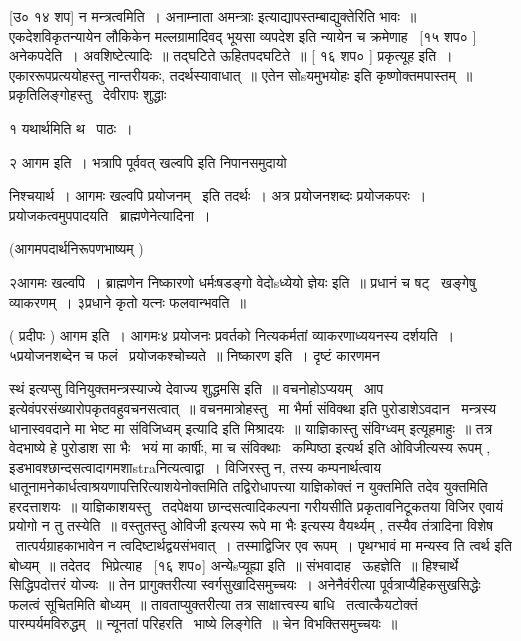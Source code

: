 \documentclass[11pt, openany]{book}
\begin{document}
 [उ० १४ शप] न मन्त्रत्वमिति~। {\qt अनाम्नाता अमन्त्राः}
इत्याद्यापस्तम्बाद्युक्तेरिति भावः~॥ एकदेशविकृतन्यायेन लौकिकेन
मल्लग्रामादिवद् भूयसा व्यपदेश इति न्यायेन च क्रमेणाह \textendash\ [१५ शप० ]
अनेकपदेति~। अवशिष्टेत्यादिः~॥ तद्घटिते ऊहितपदघटिते~॥ [ १६
शप० ] प्रकृत्यूह इति~। एकाररूपप्रत्ययोहस्तु नान्तरीयकः,
तदर्थस्यावाधात्~॥ एतेन {\qt सोsयमुभयोहः} इति कृष्णोक्तमपास्तम्~॥
प्रकृतिलिङ्गोहस्तु \textendash\ देवीरापः शुद्धाः 



१ {\qt यथार्थमिति} थ \textendash\ पाठः~। 

२ आगम इति~। भत्रापि पूर्ववत् {\qt खल्वपि} इति निपानसमुदायो 

निश्चयार्थ~। आगमः खल्वपि प्रयोजनम् \textendash\ इति तदर्थः~। अत्र प्रयोजनशब्दः
प्रयोजकपरः~। प्रयोजकत्वमुपपादयति \textendash\ ब्राह्मणेनेत्यादिना~। 





 (आगमपदार्थनिरूपणभाष्यम् ) 

 २आगमः खल्वपि~। {\qt ब्राह्मणेन निष्कारणो धर्मःषडङ्गो वेदोsध्येयो ज्ञेयः} इति~॥ प्रधानं च षट् \textendash\ खङ्गेषु व्याकरणम्~। ३प्रधाने कृतो यत्नः
फलवान्भवति~॥ 

 ( प्रदीपः ) आगम इति~। आगमः४ प्रयोजनः प्रवर्तको नित्यकर्मतां
व्याकरणाध्ययनस्य दर्शयति~। {\qt ५प्रयोजन}शब्देन च फलं \textendash\ प्रयोजकश्चोच्यते~॥
निष्कारण इति~। दृष्टं कारणमन \textendash\ 



स्थं इत्यप्सु विनियुक्तमन्त्रस्याज्ये {\qt देवाज्य शुद्धमसि} इति~॥
वचनोहोऽप्ययम् \textendash\ आप इत्येवंपरसंख्यारोपकृतवहुवचनसत्वात्~॥
वचनमात्रोहस्तु \textendash\ {\qt मा भैर्मा संविक्था} इति
पुरोडाशेऽवदान \textendash\ मन्त्रस्य धानास्ववदाने {\qt मा भेष्ट मा संविजिध्वम्}
इत्यादि इति मिश्रादयः~॥ याज्ञिकास्तु {\qt संविग्ध्वम्} इत्यूहमाहुः~॥ तत्र
वेदभाष्ये हे पुरोडाश सा भैः \textendash\ भयं मा कार्षीः, मा च संविक्थाः \textendash\ कम्पिष्ठा
इत्यर्थ इति ओविजीत्यस्य रूपम् ,
इडभावश्छान्दसत्वादागमशाstraनित्यत्वाद्वा~। विजिरस्तु न, तस्य
कम्पनार्थत्वाय धातूनामनेकार्धत्वाश्रयणापत्तिरित्याशयेनोक्तमिति
तद्विरोधापत्त्या याज्ञिकोक्तं न युक्तमिति तदेव युक्तमिति हरदत्ताशयः~॥
याज्ञिकाशयस्तु \textendash\ तदपेक्षया छान्दसत्वादिकल्पना गरीयसीति प्रकृतावनिटूकतया
विजिर एवायं प्रयोगो न तु तस्येति~॥ वस्तुतस्तु ओविजी इत्यस्य रूपे मा भैः
इत्यस्य वैयर्थ्यम् , तस्यैव तंत्रादिना विशेष \textendash\ तात्पर्यग्राहकाभावेन न
त्वदिष्टार्थद्वयसंभवात्~। तस्माद्विजिर एव रूपम्~। पृथग्भावं मा मन्यस्व
ति त्वर्थ इति बोध्यम्~॥ तदेतद \textendash\ भिप्रेत्याह \textendash\ [१६ शप०] अन्येsप्यूह्या
इति~॥ संभवादाह \textendash\ ऊहज्ञेति~॥ हिश्चार्थे सिद्धिपदोत्तरं योज्यः~॥ तेन
प्रागुक्तरीत्या स्वर्गसुखादिसमुच्चयः~। अनेनैवंरीत्या
पूर्वत्राप्यैहिकसुखसिद्धेः फलत्वं सूचितमिति बोध्यम्~॥
तावताप्युक्तरीत्या तत्र साक्षात्त्वस्य बाधि \textendash\ तत्वात्कैयटोक्तं
पारम्पर्यमविरुद्धम्~॥ न्यूनतां परिहरति \textendash\ भाष्ये लिङ्गेति~॥ चेन
विभक्तिसमुच्चयः~॥ 
\end{document}
